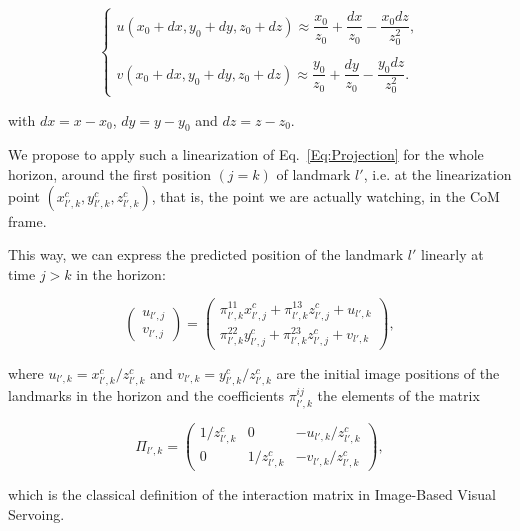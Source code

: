 $$
\left\{
\begin{array}{c}
\nonumber
 u(x_0+dx,y_0+dy,z_0+dz) \approx \dfrac{x_0}{z_0} +  \dfrac{dx}{z_0} - \dfrac{x_0 dz}{z_0^2},\\ \\
 v(x_0+dx,y_0+dy,z_0+dz) \approx \dfrac{y_0}{z_0} +  \dfrac{dy}{z_0} - \dfrac{y_0 dz}{z_0^2}.
\end{array}
\right.
$$

\noindent with $dx=x-x_0$, $dy=y-y_0$ and $dz=z-z_0$. 

We propose to apply such a linearization of Eq.~\ref{Eq:Projection} for the whole horizon, around the first position $(j=k)$ of landmark $l'$, i.e. at the linearization point $(x^{c}_{l',k},y^{c}_{l',k},z^{c}_{l',k})$, that is, the point we are actually watching, in the CoM frame. 

This way, we can express the predicted position of the landmark $l'$ linearly at time $j>k$ in the horizon:

\begin{equation*}
 \left(
 \begin{matrix}
  u_{l',j} \\
  v_{l',j}
 \end{matrix}
 \right)
 = \left(
 \begin{matrix}
  \pi^{11}_{l',k} x^{c}_{l',j} + \pi^{13}_{l',k} z^{c}_{l',j}+ u_{l',k}\\
  \pi^{22}_{l',k} y^{c}_{l',j} + \pi^{23}_{l',k} z^{c}_{l',j} + v_{l',k}
 \end{matrix}
 \right),
\end{equation*}

\noindent where $u_{l',k} = x^{c}_{l',k} / z^{c}_{l',k}$ and $v_{l',k} = y^{c}_{l',k} / z^{c}_{l',k}$ are the initial image positions of the landmarks in the horizon and the coefficients $\pi^{ij}_{l',k}$ the elements of the matrix

\begin{equation*}
\Pi_{l',k} = \left(
\begin{matrix}
 1/z^{c}_{l',k} & 0 & - u_{l',k} / z^{c}_{l',k} \\
 0 & 1/z^{c}_{l',k} & - v_{l',k} / z^{c}_{l',k}
\end{matrix}
\right),
\end{equation*}

\noindent which is the classical definition of the interaction matrix in Image-Based Visual Servoing.

